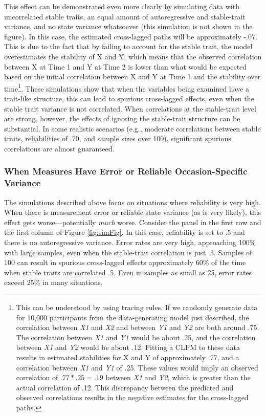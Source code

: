 \documentclass[
  english,
  man,floatsintext]{apa6}
\begin{document}
This effect can be demonstrated even more clearly by simulating data with uncorrelated stable traits, an equal amount of autoregressive and stable-trait variance, and no state variance whatsoever (this simulation is not shown in the figure). In this case, the estimated cross-lagged paths will be approximately -.07. This is due to the fact that by failing to account for the stable trait, the model overestimates the stability of X and Y, which means that the observed correlation between X at Time 1 and Y at Time 2 is lower than what would be expected based on the initial correlation between X and Y at Time 1 and the stability over time\footnote{This can be understood by using tracing rules. If we randomly generate data for 10,000 participants from the data-generating model just described, the correlation between \emph{X1} and \emph{X2} and between \emph{Y1} and \emph{Y2} are both around .75. The correlation between \emph{X1} and \emph{Y1} would be about .25, and the correlation between \emph{X1} and \emph{Y2} would be about .12. Fitting a CLPM to these data results in estimated stabilities for X and Y of approximately .77, and a correlation between \emph{X1} and \emph{Y1} of .25. These values would imply an observed correlation of \(.77 * .25 = .19\) between \emph{X1} and \emph{Y2}, which is greater than the actual correlation of .12. This discrepancy between the predicted and observed correlations results in the negative estimates for the cross-lagged paths.}. These simulations show that when the variables being examined have a trait-like structure, this can lead to spurious cross-lagged effects, even when the stable trait variance is not correlated. When correlations at the stable-trait level are strong, however, the effects of ignoring the stable-trait structure can be substantial. In some realistic scenarios (e.g., moderate correlations between stable traits, reliabilities of .70, and sample sizes over 100), significant spurious correlations are almost guaranteed.

\hypertarget{when-measures-have-error-or-reliable-occasion-specific-variance}{%
\subsubsection{When Measures Have Error or Reliable Occasion-Specific Variance}\label{when-measures-have-error-or-reliable-occasion-specific-variance}}

The simulations described above focus on situations where reliability is very high. When there is measurement error or reliable state variance (as is very likely), this effect gets worse---potentially \emph{much} worse. Consider the panel in the first row and the first column of Figure \ref{fig:simFig}. In this case, reliability is set to .5 and there is no autoregressive variance. Error rates are very high, approaching 100\% with large samples, even when the stable-trait correlation is just .3. Samples of 100 can result in spurious cross-lagged effects approximately 60\% of the time when stable traits are correlated .5. Even in samples as small as 25, error rates exceed 25\% in many situations.
\end{document}
